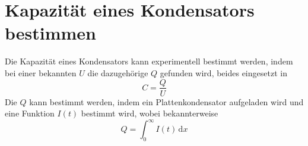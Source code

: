 \documentclass{article}
\begin{document}
\section{Kapazität eines Kondensators bestimmen}
Die Kapazität eines Kondensators kann experimentell bestimmt werden, indem bei einer bekannten $U$ die dazugehörige $Q$ gefunden wird, beides eingesetzt in
\[
 C = \frac{Q}{U} 
\] 
Die $Q$ kann bestimmt werden, indem ein Plattenkondensator aufgeladen wird und eine Funktion $I(t)$ bestimmt wird, wobei bekannterweise
\[
 Q = \int_0^\infty I(t) \, \text{d}x
\] 
\end{document}
